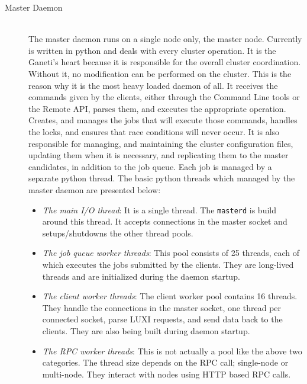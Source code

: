 \begin{description}
  \item[Master Daemon] \hfill \\
    The master daemon runs on a single node only, the master node. Currently is
    written in python and deals with every cluster operation. It is the Ganeti's
    heart because it is responsible for the overall cluster coordination.
    Without it, no modification can be performed on the cluster. This is the reason
    why it is the most heavy loaded daemon of all. It receives the commands
    given by the clients, either through the Command Line
    tools or the Remote API, parses them, and executes the appropriate
    operation. Creates, and manages the jobs that will execute those commands,
    handles the locks, and ensures that race conditions will never occur. It is
    also responsible for managing, and maintaining the cluster configuration files,
    updating them when it is necessary, and replicating them to the master
    candidates, in addition to the job queue. Each job is managed by a separate
    python thread. The basic python threads which managed by the master daemon
    are presented below:

    \begin{itemize}
      \item \emph{The main I/O thread}: It is a single thread. The
            \texttt{masterd} is build around this thread. It accepts connections
            in the master socket and setups/shutdowns the other thread pools.
      \item \emph{The job queue worker threads}: This pool consists of 25
            threads, each of which executes the jobs submitted by the clients.
            They are long-lived threads and are initialized during the daemon
            startup.
      \item \emph{The client worker threads}: The client worker pool contains 16
            threads. They handle the connections in the master socket, one thread
            per connected socket, parse LUXI requests, and send data back to the
            clients. They are also being built during daemon startup.
      \item \emph{The RPC worker threads}: This is not actually a pool like the
            above two categories. The thread size depends on the RPC call;
            single-node or multi-node. They interact with nodes using HTTP based
            RPC calls.
    \end{itemize}


\end{description}
